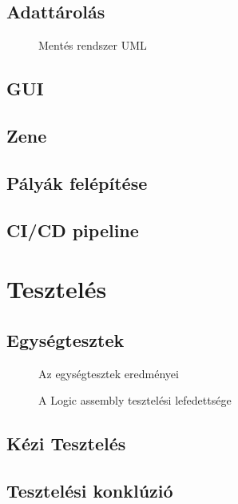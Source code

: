 \subsection{Adattárolás}
\begin{figure}[H]
	\noindent{}
	\caption{Mentés rendszer UML}
	\label{SaveSystem}
\end{figure}

\subsection{GUI}

\subsection{Zene}

\subsection{Pályák felépítése}

\subsection{CI/CD pipeline}

\cleardoublepage
\section{Tesztelés}

\subsection{Egységtesztek}

\begin{figure}[H]
	\noindent{}
	\caption{Az egységtesztek eredményei}
	\label{tests}
\end{figure}

\begin{figure}[H]
	\noindent{}
	\caption{A Logic assembly tesztelési lefedettsége}
	\label{codeCoverage}
\end{figure}


\subsection{Kézi Tesztelés}

\subsection{Tesztelési konklúzió}